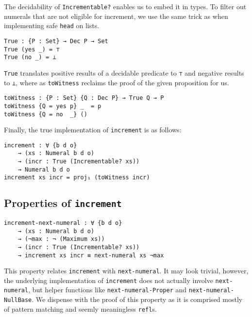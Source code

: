 \documentclass[\main/thesis.tex]{subfiles}
\begin{document}
The decidability of \lstinline|Incrementable?| enables us to embed it in types.
To filter out numerals that are not eligible for increment, we use the same trick
as when implementing safe \lstinline|head| on lists.

\begin{lstlisting}
True : {P : Set} → Dec P → Set
True (yes _) = ⊤
True (no _) = ⊥
\end{lstlisting}

\lstinline|True| translates positive results of a decidable predicate to
\lstinline|⊤| and negative results to \lstinline|⊥|,
where as \lstinline|toWitness| reclaims the proof of the given proposition for us.

\begin{lstlisting}
toWitness : {P : Set} {Q : Dec P} → True Q → P
toWitness {Q = yes p} _  = p
toWitness {Q = no  _} ()
\end{lstlisting}

Finally, the true implementation of \lstinline|increment| is as follows:

\begin{lstlisting}
increment : ∀ {b d o}
    → (xs : Numeral b d o)
    → (incr : True (Incrementable? xs))
    → Numeral b d o
increment xs incr = proj₁ (toWitness incr)
\end{lstlisting}

\subsection{Properties of \lstinline|increment|}

\begin{lstlisting}
increment-next-numeral : ∀ {b d o}
    → (xs : Numeral b d o)
    → (¬max : ¬ (Maximum xs))
    → (incr : True (Incrementable? xs))
    → increment xs incr ≡ next-numeral xs ¬max
\end{lstlisting}

This property relates \lstinline|increment| with \lstinline|next-numeral|.
It may look trivial, however, the underlying implementation of \lstinline|increment|
does not actually involve \lstinline|next-numeral|, but helper functions like
\lstinline|next-numeral-Proper| and \lstinline|next-numeral-NullBase|.
We dispense with the proof of this property as it is comprised mostly of pattern
matching and seemly meaningless \lstinline|refl|s.
\end{document}
